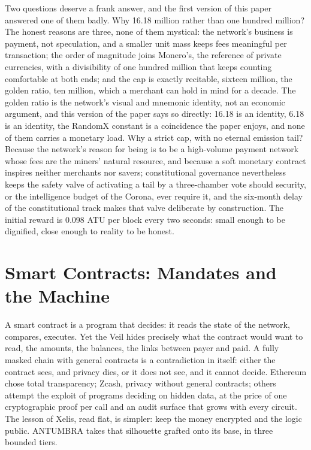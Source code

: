 Two questions deserve a frank answer, and the first version of this paper
answered one of them badly. Why 16.18 million rather than one hundred
million? The honest reasons are three, none of them mystical: the
network's business is payment, not speculation, and a smaller unit mass
keeps fees meaningful per transaction; the order of magnitude joins
Monero's, the reference of private currencies, with a divisibility of one
hundred million that keeps counting comfortable at both ends; and the cap
is exactly recitable, sixteen million, the golden ratio, ten million,
which a merchant can hold in mind for a decade. The golden ratio is the
network's visual and mnemonic identity, not an economic argument, and
this version of the paper says so directly: 16.18 is an identity, 6.18 is
an identity, the RandomX constant is a coincidence the paper enjoys, and
none of them carries a monetary load. Why a strict cap, with no eternal
emission tail? Because the network's reason for being is to be a
high-volume payment network whose fees are the miners' natural resource,
and because a soft monetary contract inspires neither merchants nor
savers; constitutional governance nevertheless keeps the safety valve of
activating a tail by a three-chamber vote should security, or the
intelligence budget of the Corona, ever require it, and the six-month
delay of the constitutional track makes that valve deliberate by
construction. The initial reward is 0.098 ATU per block every two
seconds: small enough to be dignified, close enough to reality to be
honest.

\section{Smart Contracts: Mandates and the Machine}\label{sec:contracts}

A smart contract is a program that decides: it reads the state of the
network, compares, executes. Yet the Veil hides precisely what the
contract would want to read, the amounts, the balances, the links
between payer and paid. A fully masked chain with general contracts is
a contradiction in itself: either the contract sees, and privacy dies,
or it does not see, and it cannot decide. Ethereum chose total
transparency; Zcash, privacy without general contracts; others attempt
the exploit of programs deciding on hidden data, at the price of one
cryptographic proof per call and an audit surface that grows with every
circuit. The lesson of Xelis, read flat, is simpler: keep the money
encrypted and the logic public. ANTUMBRA takes that silhouette grafted
onto its base, in three bounded tiers.


